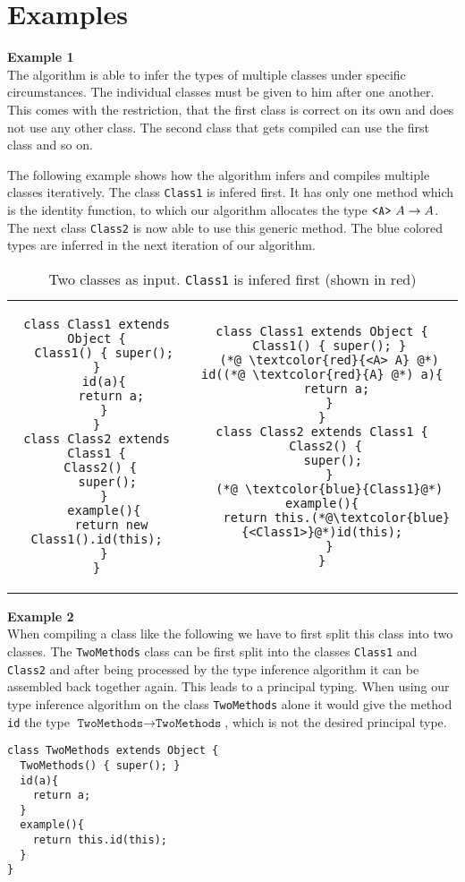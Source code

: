 \documentclass[a4paper,USenglish,cleveref, autoref, thm-restate]{lipics-v2021}
\begin{document}


\section{Examples}
\label{sec:examples}



\textbf{Example 1}\\
The algorithm is able to infer the types of multiple classes under specific circumstances.
The individual classes must be given to him after one another.
This comes with the restriction, that the first class is correct on its own and does not use any other class.
The second class that gets compiled can use the first class and so on.

The following example shows how the algorithm infers and compiles multiple classes iteratively.
The class \texttt{Class1} is infered first.
It has only one method which is the identity function,
to which our algorithm allocates the type $\mathtt{ \texttt{<} A \texttt{>} }\ A \to A$.
The next class \texttt{Class2} is now able to use this generic method.
The blue colored types are inferred in the next iteration of our algorithm.

\begin{table}
\caption{Two classes as input. \texttt{Class1} is infered first (shown in {\color{red}red})}
\begin{tabular}{cc}
\begin{lstlisting}
class Class1 extends Object {
  Class1() { super(); }
  id(a){
    return a;
  }
}
class Class2 extends Class1 {
  Class2() { 
    super(); 
  }
  example(){
    return new Class1().id(this);
  }
}
\end{lstlisting}
&
\begin{lstlisting}
class Class1 extends Object {
  Class1() { super(); }
  (*@ \textcolor{red}{<A> A} @*) id((*@ \textcolor{red}{A} @*) a){
    return a;
  }
}
class Class2 extends Class1 {
  Class2() { 
    super(); 
  }
  (*@ \textcolor{blue}{Class1}@*) example(){
    return this.(*@\textcolor{blue}{<Class1>}@*)id(this);
  }
}
\end{lstlisting}
\end{tabular}
\end{table}

\textbf{Example 2}\\
When compiling a class like the following
we have to first split this class into two classes.
The \texttt{TwoMethods} class can be first split into the classes \texttt{Class1}
and \texttt{Class2} and after being processed by the type inference algorithm it can be assembled back together again.
This leads to a principal typing.
When using our type inference algorithm on the class \texttt{TwoMethods} alone
it would give the method \texttt{id} the type $\texttt{TwoMethods} \to \texttt{TwoMethods}$,
which is not the desired principal type.
\begin{lstlisting}
class TwoMethods extends Object {
  TwoMethods() { super(); }
  id(a){
    return a;
  }
  example(){
    return this.id(this);
  }
}
\end{lstlisting}
\end{document}
